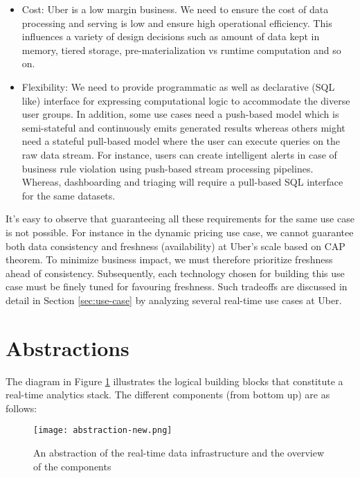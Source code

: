 \documentclass[sigconf]{acmart}
\begin{document}
\begin{itemize}
\item  Cost: Uber is a low margin business. We need to ensure the cost of data processing and serving is low and ensure high operational efficiency. This influences a variety of design decisions such as amount of data kept in memory, tiered storage, pre-materialization vs runtime computation and so on.

\item Flexibility: We need to provide programmatic as well as declarative (SQL like) interface for expressing computational logic to accommodate the diverse user groups. In addition, some use cases need a push-based model which is semi-stateful and continuously emits generated results whereas others might need a stateful pull-based model where the user can execute queries on the raw data stream. For instance, users can create intelligent alerts in case of business rule violation using push-based stream processing pipelines. Whereas, dashboarding and triaging will require a pull-based SQL interface for the same datasets.
\end{itemize}

It’s easy to observe that guaranteeing all these requirements for the same use case is not possible. For instance in the dynamic pricing use case, we cannot guarantee both data consistency and freshness (availability) at Uber’s scale based on CAP theorem\cite{gilbert2002brewer}. To minimize business impact, we must therefore prioritize freshness ahead of consistency. Subsequently, each technology chosen for building this use case must be finely tuned for favouring freshness. Such tradeoffs are discussed in detail in Section \ref{sec:use-case} by analyzing several real-time use cases at Uber.

\section{Abstractions} \label{sec:abstractions}

The diagram in Figure \ref{fig:abstractions} illustrates the logical building blocks that constitute a real-time analytics stack. The different components (from bottom up) are as follows:

\begin{figure}[h]
  \centering
  \texttt{[image: abstraction-new.png]}
  \caption{An abstraction of the real-time data infrastructure and the overview of the components}
  \label{fig:abstractions}
\end{figure}
\end{document}
